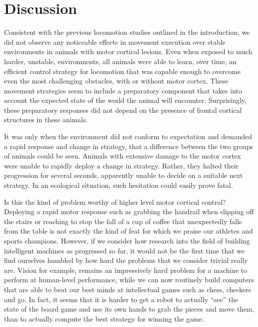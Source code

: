 \section{Discussion}

Consistent with the previous locomotion studies outlined in the introduction, we did not observe any noticeable effects in movement execution over stable environments in animals with motor cortical lesions. Even when exposed to much harder, unstable, environments, all animals were able to learn, over time, an efficient control strategy for locomotion that was capable enough to overcome even the most challenging obstacles, with or without motor cortex. These movement strategies seem to include a preparatory component that takes into account the expected state of the world the animal will encounter. Surprisingly, these preparatory responses did not depend on the presence of frontal cortical structures in these animals.

It was only when the environment did not conform to expectation and demanded a rapid response and change in strategy, that a difference between the two groups of animals could be seen. Animals with extensive damage to the motor cortex were unable to rapidly deploy a change in strategy. Rather, they halted their progression for several seconds, apparently unable to decide on a suitable next strategy. In an ecological situation, such hesitation could easily prove fatal.

Is this the kind of problem worthy of higher level motor cortical control? Deploying a rapid motor response such as grabbing the handrail when slipping off the stairs or reaching to stop the fall of a cup of coffee that unexpectedly falls from the table is not exactly the kind of feat for which we praise our athletes and sports champions. However, if we consider how research into the field of building intelligent machines as progressed so far, it would not be the first time that we find ourselves humbled by how hard the problems that we consider trivial really are. Vision for example, remains an impressively hard problem for a machine to perform at human-level performance, while we can now routinely build computers that are able to beat our best minds at intellectual games such as chess, checkers and go. In fact, it seems that it is harder to get a robot to actually ``see'' the state of the board game and use its own hands to grab the pieces and move them, than to actually compute the best strategy for winning the game.

